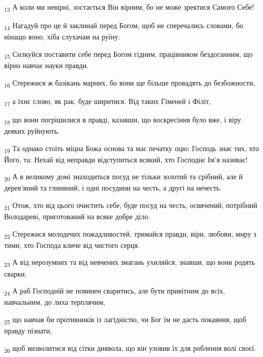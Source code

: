 \begin{tcolorbox}
\textsubscript{13} А коли ми невірні, зостається Він вірним, бо не може зректися Самого Себе!
\end{tcolorbox}
\begin{tcolorbox}
\textsubscript{14} Нагадуй про це й заклинай перед Богом, щоб не сперечались словами, бо нінащо воно, хіба слухачам на руїну.
\end{tcolorbox}
\begin{tcolorbox}
\textsubscript{15} Силкуйся поставити себе перед Богом гідним, працівником бездоганним, що вірно навчає науки правди.
\end{tcolorbox}
\begin{tcolorbox}
\textsubscript{16} Стережися ж базікань марних, бо вони ще більше провадять до безбожности,
\end{tcolorbox}
\begin{tcolorbox}
\textsubscript{17} а їхнє слово, як рак, буде ширитися. Від таких Гіменей і Філіт,
\end{tcolorbox}
\begin{tcolorbox}
\textsubscript{18} що вони погрішилися в правді, казавши, що воскресіння було вже, і віру деяких руйнують.
\end{tcolorbox}
\begin{tcolorbox}
\textsubscript{19} Та однако стоїть міцна Божа основа та має печатку оцю: Господь знає тих, хто Його, та: Нехай від неправди відступиться всякий, хто Господнє Ім'я називає!
\end{tcolorbox}
\begin{tcolorbox}
\textsubscript{20} А в великому домі знаходиться посуд не тільки золотий та срібний, але й дерев'яний та глиняний, і одні посудини на честь, а другі на нечесть.
\end{tcolorbox}
\begin{tcolorbox}
\textsubscript{21} Отож, хто від цього очистить себе, буде посуд на честь, освячений, потрібний Володареві, приготований на всяке добре діло.
\end{tcolorbox}
\begin{tcolorbox}
\textsubscript{22} Стережися молодечих пожадливостей, тримайся правди, віри, любови, миру з тими, хто Господа кличе від чистого серця.
\end{tcolorbox}
\begin{tcolorbox}
\textsubscript{23} А від нерозумних та від невчених змагань ухиляйся, знавши, що вони родять сварки.
\end{tcolorbox}
\begin{tcolorbox}
\textsubscript{24} А раб Господній не повинен сваритись, але бути привітним до всіх, навчальним, до лиха терплячим,
\end{tcolorbox}
\begin{tcolorbox}
\textsubscript{25} що навчав би противників із лагідністю, чи Бог їм не дасть покаяння, щоб правду пізнати,
\end{tcolorbox}
\begin{tcolorbox}
\textsubscript{26} щоб визволитися від сітки диявола, що він уловив їх для роблення волі своєї.
\end{tcolorbox}
